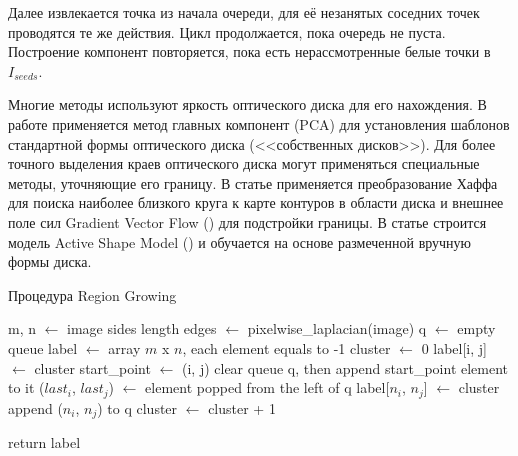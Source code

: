 \documentclass[12pt,fleqn]{article}
\begin{document}
Далее извлекается точка из начала очереди, для её незанятых соседних точек проводятся те же действия. Цикл продолжается, пока очередь не пуста. Построение компонент повторяется, пока есть нерассмотренные белые точки в $I_{seeds}$.

Многие методы используют яркость оптического диска для его нахождения. В работе \cite{huiqi_li} применяется метод главных компонент (PCA) для установления шаблонов стандартной формы оптического диска (<<собственных дисков>>). Для более точного выделения краев оптического диска могут применяться специальные методы, уточняющие его границу. В статье \cite{chernomorets} применяется преобразование Хаффа для поиска наиболее близкого круга к карте контуров в области диска и внешнее поле сил Gradient Vector Flow (\cite{GVF}) для подстройки границы. В статье \cite{huiqi_li} строится модель Active Shape Model (\cite[стр. 273]{szeliski}) и обучается на основе размеченной вручную формы диска.

\begin{algorithm}
  \caption{Процедура Region Growing}
  \begin{algorithmic}
     {} 
    	   \State {}
    	   \State m, n $\leftarrow$ image sides length
	   \State edges $\leftarrow$ pixelwise\_laplacian(image) 
	   \State q $\leftarrow$ empty queue
	   \State label $\leftarrow$ array $m$ x $n$, each element equals to -1
	   \State cluster $\leftarrow$ 0
            			\State label[i, j] $\leftarrow$ cluster
            			\State start\_point $\leftarrow$ (i, j)
            			\State clear queue q, then append start\_point element to it
            				\State ($last_i$, $last_j$) $\leftarrow$ element popped from the left of q
            						\State label[$n_i$, $n_j$] $\leftarrow$ cluster
            						\State append ($n_i$, $n_j$) to q
            					\EndIf
            				\EndFor
            			\EndWhile
            			\State cluster $\leftarrow$ cluster + 1
            		\EndIf
            	\EndFor
            \EndFor
            
            return label
    \EndFunction
  \end{algorithmic}
  \label{algo:region_growing}
\end{algorithm}
\end{document}
